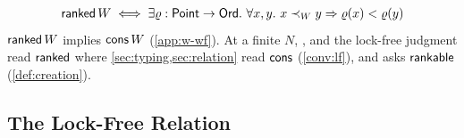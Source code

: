 \begin{definition}
\label{def:ranked}
\begin{gather*}
  \mathsf{ranked}\,W \iff \exists \varrho : \mathsf{Point} \to \mathsf{Ord}.\ \forall x, y.\ x \prec_{W} y \Rightarrow \varrho(x) < \varrho(y)
\end{gather*}
$\mathsf{ranked}\,W$ implies $\mathsf{cons}\,W$ (\cref{app:w-wf}). At a finite $N$, ,  and the lock-free judgment read $\mathsf{ranked}$ where \cref{sec:typing,sec:relation} read $\mathsf{cons}$ (\cref{conv:lf}), and  asks $\mathsf{rankable}$ (\cref{def:creation}).
\end{definition}
\begin{example}
\label{ex:forkjoin}

\end{example}


\subsection{The Lock-Free Relation}
\label{sec:lf-relation}

